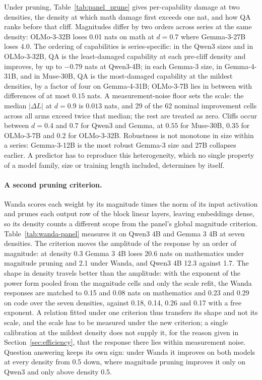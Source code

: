 

Under pruning, Table~\ref{tab:panel_prune} gives per-capability
damage at two densities, the density at which math damage first exceeds
one nat, and how QA ranks before that cliff. Magnitudes differ by two orders across series at the same density: OLMo-3-32B loses 0.01 nats on math at $d=0.7$ where Gemma-3-27B loses 4.0. The ordering of capabilities is
series-specific: in the Qwen3 sizes and in OLMo-3-32B, QA is the
least-damaged capability at each pre-cliff density and improves, by up
to $-0.79$ nats at Qwen3-4B; in each Gemma-3 size, in Gemma-4-31B,
and in Muse-30B, QA is the most-damaged capability at the mildest densities, by a factor of four on Gemma-4-31B;
OLMo-3-7B lies in between with differences of at most $0.15$ nats. A
measurement-noise floor sets the scale: the median $|\Delta L|$ at $d=0.9$ is
$0.013$ nats, and 29 of the 62 nominal improvement cells across all
arms exceed twice that median; the rest are treated as zero. Cliffs occur between $d=0.4$ and $0.7$ for Qwen3 and Gemma, at $0.55$ for Muse-30B, $0.35$ for
OLMo-3-7B and $0.2$ for OLMo-3-32B. Robustness is not monotone in size within a series: Gemma-3-12B is the most robust Gemma-3 size and 27B collapses earlier.
A predictor has to reproduce this heterogeneity, which no single property of a model family, size or training length included, determines by itself.

\paragraph{A second pruning criterion.} Wanda \citep{sun2023simple} scores each weight by its
magnitude times the norm of its input activation and prunes each output row of the block linear
layers, leaving embeddings dense, so its density counts a different scope from the panel's global
magnitude criterion. Table~\ref{tab:wanda-panel} measures it on Qwen3 4B and Gemma 3 4B at seven
densities. The criterion moves the amplitude of the response by an order of magnitude: at density
0.3 Gemma 3 4B loses 20.6 nats on mathematics under magnitude pruning and 2.1 under Wanda, and
Qwen3 4B 12.3 against 1.7. The shape in density travels better than the amplitude: with the exponent
of the power form pooled from the magnitude cells and only the scale refit, the Wanda responses are
matched to 0.15 and 0.08 nats on mathematics and 0.23 and 0.29 on code over the seven densities,
against 0.18, 0.14, 0.26 and 0.17 with a free exponent. A relation fitted under one criterion thus
transfers its shape and not its scale, and the scale has to be measured under the new criterion; a
single calibration at the mildest density does not supply it, for the reason given in
Section~\ref{sec:efficiency}, that the response there lies within measurement noise. Question
answering keeps its own sign: under Wanda it improves on both models at every density from 0.5
down, where magnitude pruning improves it only on Qwen3 and only above density 0.5.


